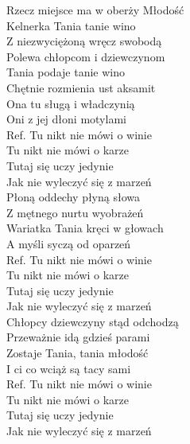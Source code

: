 
\begin{flushleft}
Rzecz miejsce ma w oberży Młodość \\
Kelnerka Tania tanie wino \\
Z niezwyciężoną wręcz swobodą \\
Polewa chłopcom i dziewczynom \\
\vskip 3mm
Tania podaje tanie wino \\
Chętnie rozmienia ust aksamit \\
Ona tu sługą i władczynią \\
Oni z jej dłoni motylami \\
\vskip 3mm
Ref. Tu nikt nie mówi o winie\\
\hspace{0.9cm}Tu nikt nie mówi o karze \\
\hspace{0.9cm}Tutaj się uczy jedynie \\
\hspace{0.9cm}Jak nie wyleczyć się z marzeń \\
\vskip 3mm
Płoną oddechy płyną słowa \\
Z mętnego nurtu wyobrażeń \\
Wariatka Tania kręci w głowach \\
A myśli syczą od oparzeń \\
\vskip 3mm
Ref. Tu nikt nie mówi o winie\\
\hspace{0.9cm}Tu nikt nie mówi o karze \\
\hspace{0.9cm}Tutaj się uczy jedynie \\
\hspace{0.9cm}Jak nie wyleczyć się z marzeń \\
\vskip 3mm
Chłopcy dziewczyny stąd odchodzą \\
Przeważnie idą gdzieś parami \\
Zostaje Tania, tania młodość \\
I ci co wciąż są tacy sami \\
\vskip 3mm
Ref. Tu nikt nie mówi o winie\\
\hspace{0.9cm}Tu nikt nie mówi o karze \\
\hspace{0.9cm}Tutaj się uczy jedynie \\
\hspace{0.9cm}Jak nie wyleczyć się z marzeń \\
\end{flushleft}
\clearpage
